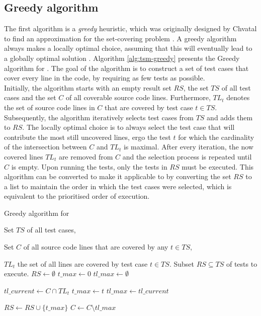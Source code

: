 
\subsection{Greedy algorithm}
\label{ssec:alg-greedy}
The first algorithm is a \emph{greedy} heuristic, which was originally designed by Chvatal to find an approximation for the set-covering problem \cite{evaluationoftestsuiteminimization}. A greedy algorithm always makes a locally optimal choice, assuming that this will eventually lead to a globally optimal solution \cite{10.5555/1614191}. Algorithm \ref{alg:tsm-greedy} presents the Greedy algorithm for \tsm{}. The goal of the algorithm is to construct a set of test cases that cover every line in the code, by requiring as few tests as possible.\\

\noindent Initially, the algorithm starts with an empty result set $RS$, the set $TS$ of all test cases and the set $C$ of all coverable source code lines. Furthermore, $TL_t$ denotes the set of source code lines in $C$ that are covered by test case $t \in TS$. Subsequently, the algorithm iteratively selects test cases from $TS$ and adds them to $RS$. The locally optimal choice is to always select the test case that will contribute the most still uncovered lines, ergo the test $t$ for which the cardinality of the intersection between $C$ and $TL_t$ is maximal. After every iteration, the now covered lines $TL_t$ are removed from $C$ and the selection process is repeated until $C$ is empty. Upon running the tests, only the tests in $RS$ must be executed. This algorithm can be converted to make it applicable to \tcp{} by converting the set $RS$ to a list to maintain the order in which the test cases were selected, which is equivalent to the prioritised order of execution.

\begin{algorithm}[h!]
\caption{Greedy algorithm for \tsm{}}
\label{alg:tsm-greedy}
\begin{algorithmic}[1]
	 Set $TS$ of all test cases,
	
	Set $C$ of all source code lines that are covered by any $t \in TS$,
	
	$TL_t$ the set of all lines are covered by test case $t \in TS$.
	 Subset $RS \subseteq TS$ of tests to execute.
	\State $RS \gets \emptyset$
		\State $t\_max \gets 0$
		\State $tl\_max \gets \emptyset$
		
			\State $tl\_current \gets C \cap TL_{t}$
				\State $t\_max \gets t$
				\State $tl\_max \gets tl\_current$
			\EndIf
		\EndFor
		
		\State $RS \gets RS \cup \{t\_max\}$
		\State $C \gets C \setminus tl\_max$
	\EndWhile
\end{algorithmic}
\end{algorithm}
